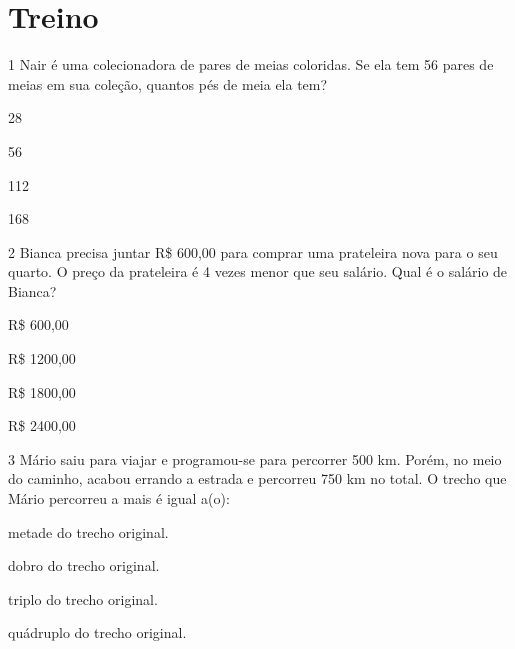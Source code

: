 \pagebreak
\section*{Treino}

\num{1} Nair é uma colecionadora de pares de meias coloridas. Se
ela tem 56 pares de meias em sua coleção, quantos pés de meia ela tem?

\begin{escolha}[itemsep=-5pt]
\item 28

\item 56

\item 112

\item 168
\end{escolha}

\num{2} Bianca precisa juntar R\$ 600,00 para comprar uma prateleira nova para o
seu quarto. O preço da prateleira é 4 vezes menor que seu salário. Qual
é o salário de Bianca?

\begin{escolha}[itemsep=-5pt]
\item R\$ 600,00

\item R\$ 1200,00

\item R\$ 1800,00

\item R\$ 2400,00
\end{escolha}

\num{3} Mário saiu para viajar e programou-se para percorrer 500 km. Porém, no
meio do caminho, acabou errando a estrada e percorreu 750 km no total. O
trecho que Mário percorreu a mais é igual a(o):

\begin{escolha}[itemsep=-5pt]
\item metade do trecho original.

\item dobro do trecho original.

\item triplo do trecho original.

\item quádruplo do trecho original.
\end{escolha}